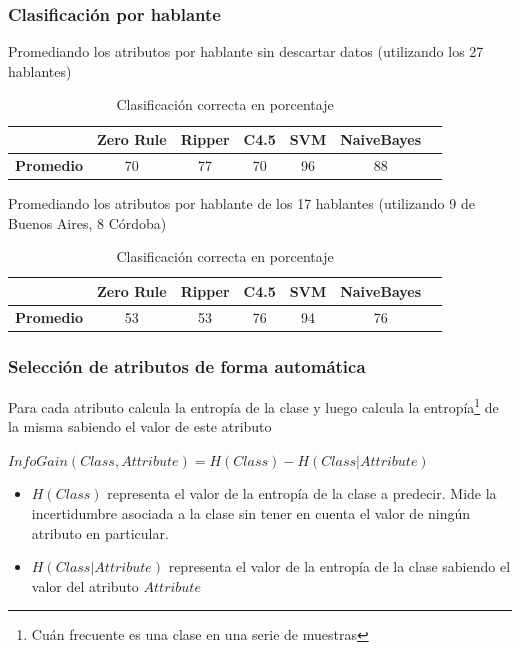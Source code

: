 \documentclass[mathserif]{beamer}%
\begin{document}
\begin{frame}[noframenumbering]
	\frametitle{Clasificación por hablante}
	
	Promediando los atributos por hablante sin descartar datos (utilizando los 27 hablantes)
	
	{\small 	
		\begin{table}[H]
			\centering
			\begin{tabular}{|l|c|c|c|c|c|c|}
				\hline
				\textbf{}  & \textbf{Zero Rule} & \textbf{Ripper} & \textbf{C4.5} & \textbf{SVM} & \textbf{NaiveBayes} \\ \hline
				\textbf{Promedio} & 70  & 77 & 70 & 96 & 88 \\ \hline
			\end{tabular}
			\caption{Clasificación correcta en porcentaje}
			\label{HPTDT_clas_xval_porHab}
		\end{table}
	}
	
	Promediando los atributos por hablante de los 17 hablantes
	(utilizando 9 de Buenos Aires, 8 Córdoba)
	
	{\small 	
		\begin{table}[H]
			\centering
			\begin{tabular}{|l|c|c|c|c|c|c|}
				\hline
				\textbf{}  & \textbf{Zero Rule} & \textbf{Ripper} & \textbf{C4.5} & \textbf{SVM} & \textbf{NaiveBayes} \\ \hline
				\textbf{Promedio} & 53  & 53 & 76 & 94 & 76 \\ \hline
			\end{tabular}
			\caption{Clasificación correcta en porcentaje}
			\label{HPTDT_clas_xval_porHab}
		\end{table}
	}
	
\end{frame}

\begin{frame}[noframenumbering]
	\frametitle{Selección de atributos de forma automática}
	
	Para cada atributo calcula la entropía de la clase y luego calcula la entropía\footnote{Cuán frecuente es una clase en una serie de muestras} de la misma sabiendo el valor de este atributo
	
	\begin{center}
		$InfoGain(Class,Attribute) = H(Class) - H(Class | Attribute)$
	\end{center}
	
	\begin{itemize}
		\item $H(Class)$ representa el valor de la entropía de la clase a predecir. Mide la incertidumbre asociada a la clase sin tener en cuenta el valor de ningún atributo en particular.
		\item $H(Class | Attribute)$ representa el valor de la entropía de la clase sabiendo el valor del atributo $Attribute$
	\end{itemize}
\end{frame}

\setcounter{framenumber}{\value{finalframe}}
\end{document}
